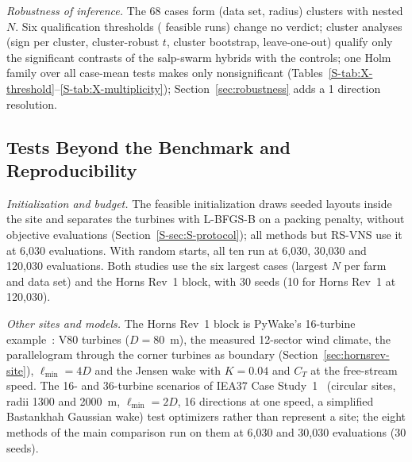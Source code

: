 \emph{Robustness of inference.} The 68 cases form \NXClusters{} (data set, radius) clusters with nested $N$. Six qualification thresholds (\NXThrList{} feasible runs) change no verdict; cluster analyses (sign per cluster, cluster-robust $t$, cluster bootstrap, leave-one-out) qualify only the significant contrasts of the salp-swarm hybrids with the controls; one Holm family over all \NXMultN{} case-mean tests makes only \NXMultLostHolm{} nonsignificant (Tables~\ref{S-tab:X-threshold}--\ref{S-tab:X-multiplicity}); Section~\ref{sec:robustness} adds a 1\textdegree{} direction resolution.

\subsection{Tests Beyond the Benchmark and Reproducibility}
\label{sec:setup-beyond}
\label{sec:validation}
\emph{Initialization and budget.} The feasible initialization draws seeded layouts inside the site and separates the turbines with L-BFGS-B on a packing penalty, without objective evaluations (Section~\ref{S-sec:S-protocol}); all methods but RS-VNS use it at 6,030 evaluations. With random starts, all ten run at 6,030, 30,030 and 120,030 evaluations. Both studies use the six largest cases (largest $N$ per farm and data set) and the Horns Rev~1 block, with 30 seeds (10 for Horns Rev~1 at 120,030).

\emph{Other sites and models.} The Horns Rev~1 block is PyWake's 16-turbine example~\cite{PyWake}: V80 turbines ($D=80$~m), the measured 12-sector wind climate, the parallelogram through the corner turbines as boundary (Section~\ref{sec:hornsrev-site}), $\ell_{\min}=4D$ and the Jensen wake with $K=0.04$ and $C_T$ at the free-stream speed.
The 16- and 36-turbine scenarios of IEA37 Case Study~1~\cite{Baker2019,IEA37repo} (circular sites, radii 1300 and 2000~m, $\ell_{\min}=2D$, 16 directions at one speed, a simplified Bastankhah Gaussian wake) test optimizers rather than represent a site; the eight methods of the main comparison run on them at 6,030 and 30,030 evaluations (30 seeds).

